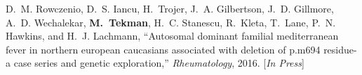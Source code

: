 \begin{thebibliography}{10}
\BIBentryALTinterwordspacing
D.~M. Rowczenio, D.~S. Iancu, H.~Trojer, J.~A. Gilbertson, J.~D. Gillmore,
  A.~D. Wechalekar, \textbf{M.~Tekman}, H.~C. Stanescu, R.~Kleta, T.~Lane, P.~N.
  Hawkins, and H.~J. Lachmann, ``Autosomal dominant familial mediterranean
  fever in northern european caucasians associated with deletion of p.m694
  residue-a case series and genetic exploration,'' \emph{Rheumatology}, 2016. [\textit{In Press}]
\BIBentrySTDinterwordspacing

\end{thebibliography}
\endgroup

\pagebreak
